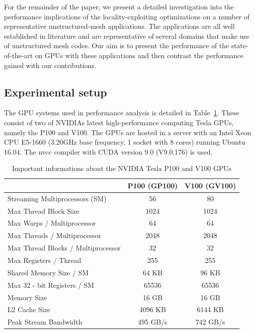 \noindent For the remainder of the paper, we present a detailed investigation 
into the performance implications of the locality-exploiting optimizations on a 
number of representative unstructured-mesh applications. The applications are 
all well established in literature and are representative of several domains 
that make use of unstructured mesh codes. Our aim is to present the performance 
of the state-of-the-art on GPUs with these applications and then contrast the 
performance gained with our contributions. 

\subsection{Experimental setup}\label{experimental-setup}

\noindent The GPU systems used in performance analysis is detailed in 
Table~\ref{tab:GPU_datasheet}. These consist of two of NVIDIAs latest 
high-performance computing Tesla GPUs, namely the P100 and V100. The GPUs are 
hosted in a server with an Intel Xeon CPU E5-1660 (3.20GHz base frequency, 1 
socket with 8 cores) running Ubuntu 16.04. The nvcc compiler with CUDA version 
9.0 (V9.0.176) is used. 
\begin{table}
\centering
\begin{tabular}{lcc}
\hline
  & P100 (GP100) & V100 (GV100)\\ \hline\hline
  Streaming Multiprocessors (SM) 		& 56	& 80\\ \hline
  Max Thread Block Size				& 1024	& 1024 \\ \hline
  Max Warps / Multiprocessor 			& 64 & 64	\\ \hline
  Max Threads / Multiprocessor		& 2048 & 2048	\\ \hline
  Max Thread Blocks / Multiprocessor 	& 32 & 32	\\ \hline
  Max Registers / Thread& 255 & 255	\\ \hline
  Shared Memory Size / SM	& 64 KB & 96 KB	\\ \hline
  Max 32 - bit Registers / SM			& 65536 & 65536\\ \hline
  Memory Size							& 16 GB	& 16 
GB\\ \hline
  L2 Cache Size						& 4096 KB & 6144 KB\\ 
\hline
  Peak Stream Bandwidth					& 495 GB/s & 742 GB/s\\ 
\hline
\end{tabular}
  \caption{Important informations about the NVIDIA Tesla P100 and V100 GPUs
  \cite{Pascal_whitepaper, Volta_whitepaper}}
\label{tab:GPU_datasheet}
\end{table}


